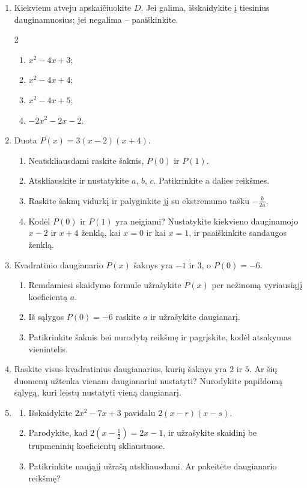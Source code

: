 \documentclass[12pt,a4paper]{article}
\begin{document}
\begin{enumerate}[series=uzdaviniai]
\item Kiekvienu atveju apskaičiuokite $D$. Jei galima, išskaidykite į tiesinius dauginamuosius; jei negalima – paaiškinkite.
\begin{multicols}{2}\begin{enumerate}
\item $x^2-4x+3$; \item $x^2-4x+4$; \item $x^2-4x+5$; \item $-2x^2-2x-2$.
\end{enumerate}\end{multicols}
\item Duota $P(x)=3(x-2)(x+4)$.
\begin{enumerate}
\item Neatskliausdami raskite šaknis, $P(0)$ ir $P(1)$.
\item Atskliauskite ir nustatykite $a$, $b$, $c$. Patikrinkite a dalies reikšmes.
\item Raskite šaknų vidurkį ir palyginkite jį su ekstremumo tašku $-\frac{b}{2a}$.
\item Kodėl $P(0)$ ir $P(1)$ yra neigiami? Nustatykite kiekvieno dauginamojo $x-2$ ir $x+4$ ženklą, kai $x=0$ ir kai $x=1$, ir paaiškinkite sandaugos ženklą.
\end{enumerate}
\item Kvadratinio daugianario $P(x)$ šaknys yra $-1$ ir $3$, o $P(0)=-6$.
\begin{enumerate}
\item Remdamiesi skaidymo formule užrašykite $P(x)$ per nežinomą vyriausiąjį koeficientą $a$.
\item Iš sąlygos $P(0)=-6$ raskite $a$ ir užrašykite daugianarį.
\item Patikrinkite šaknis bei nurodytą reikšmę ir pagrįskite, kodėl atsakymas vienintelis.
\end{enumerate}
\item Raskite visus kvadratinius daugianarius, kurių šaknys yra $2$ ir $5$. Ar šių duomenų užtenka vienam daugianariui nustatyti? Nurodykite papildomą sąlygą, kuri leistų nustatyti vieną daugianarį.
\item \begin{enumerate}
\item Išskaidykite $2x^2-7x+3$ pavidalu $2(x-r)(x-s)$.
\item Parodykite, kad $2\left(x-\frac{1}{2}\right)=2x-1$, ir užrašykite skaidinį be trupmeninių koeficientų skliaustuose.
\item Patikrinkite naująjį užrašą atskliausdami. Ar pakeitėte daugianario reikšmę?

\end{enumerate}
\end{enumerate}
\end{document}
